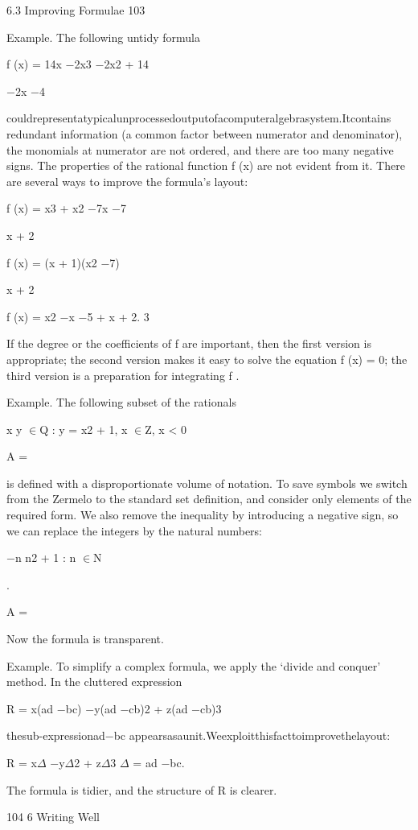 \documentclass[11pt]{article}
\theoremstyle{plain}
\theoremstyle{definition}
\begin{document}
6.3 Improving Formulae 103

Example. The following untidy formula

f (x) = 14x $-$2x3 $-$2x2 + 14

$-$2x $-$4

couldrepresentatypicalunprocessedoutputofacomputeralgebrasystem.Itcontains redundant information (a common factor between numerator and denominator), the monomials at numerator are not ordered, and there are too many negative signs. The properties of the rational function f (x) are not evident from it. There are several ways to improve the formula's layout:

f (x) = x3 + x2 $-$7x $-$7

x + 2

f (x) = (x + 1)(x2 $-$7)

x + 2

f (x) = x2 $-$x $-$5 + x + 2. 3

If the degree or the coefficients of f are important, then the first version is appropriate; the second version makes it easy to solve the equation f (x) = 0; the third version is a preparation for integrating f .

Example. The following subset of the rationals

x y $\in$Q : y = x2 + 1, x $\in$Z, x < 0

A =

is defined with a disproportionate volume of notation. To save symbols we switch from the Zermelo to the standard set definition, and consider only elements of the required form. We also remove the inequality by introducing a negative sign, so we can replace the integers by the natural numbers:

$-$n n2 + 1 : n $\in$N

.

A =

Now the formula is transparent.

Example. To simplify a complex formula, we apply the `divide and conquer' method. In the cluttered expression

R = x(ad $-$bc) $-$y(ad $-$cb)2 + z(ad $-$cb)3

thesub-expressionad$-$bc appearsasaunit.Weexploitthisfacttoimprovethelayout:

R = x$\Delta$ $-$y$\Delta$2 + z$\Delta$3 $\Delta$ = ad $-$bc.

The formula is tidier, and the structure of R is clearer.

104 6 Writing Well
\end{document}
